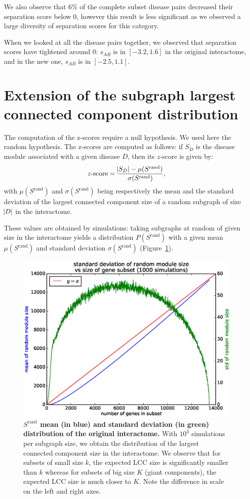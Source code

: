 \documentclass[letterpaper]{article}
\begin{document}
	We also observe that $6\%$ of the complete subset disease pairs decreased their separation score below 0,
	however this result is less significant as we observed a large diversity of separation scores for this category.

	When we looked at all the disease pairs together, we observed that separation scores have tightened around 0:
	$s_{AB}$ is in $[-3.2, 1.6]$ in the original interactome, and in the new one, $s_{AB}$ is in $[-2.5, 1.1]$.


\section{Extension of the subgraph largest connected component distribution}
The computation of the z-scores require a null hypothesis. We used here the random hypothesis. The z-scores
are computed as follows: if $S_D$ is the disease module associated with a given disease $D$, then its
$z$-score is given by:
\begin{equation}
	z\text{-score} = \frac {\abs {S_D} - \mu(S^{\text{rand}})}{\sigma(S^{\text{rand}})},
\end{equation}
with $\mu(S^{\text{rand}})$ and $\sigma(S^{\text{rand}})$ being respectively the mean and the standard
deviation of the largest connected component size of a random subgraph of size $\abs D$ in the interactome.

These values are obtained by simulations: taking subgraphs at random of given size in the interactome yields a
distribution $P(S^{\text{rand}})$ with a given mean $\mu(S^{\text{rand}})$ and standard deviation
$\sigma(S^{\text{rand}})$ (Figure~\ref{fig:Srand distribution}).

\begin{figure}[!h]
	\hspace{-.2cm}
	\includegraphics[width=.5\textwidth]{images/Srand_distribution_1000_sims.eps}
	\vspace{-.5cm}
	\caption{{\bf $S^{\text{rand}}$ mean (in blue) and standard deviation (in green) distribution of the original
	interactome.} With $10^3$ simulations per subgraph size, we obtain the distribution of the largest connected
	component size in the interactome. We observe that for subsets of small size $k$, the expected LCC size is
	significantly smaller than $k$ whereas for subsets of big size $K$ (giant components), the expected LCC
	size is much closer to $K$. Note the difference in scale on the left and right axes.
	\label{fig:Srand distribution}}
	\vspace{-.5cm}
\end{figure}
\end{document}

